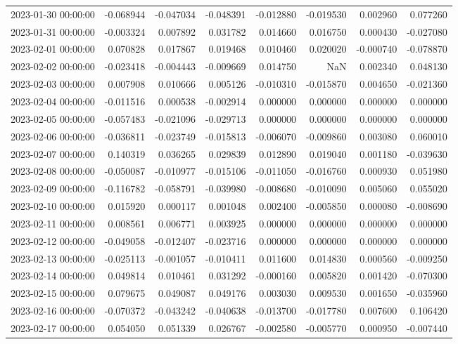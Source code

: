 \begin{tabular}{lrrrrrrr}
2023-01-30 00:00:00 & -0.068944 & -0.047034 & -0.048391 & -0.012880 & -0.019530 & 0.002960 & 0.077260 \\
2023-01-31 00:00:00 & -0.003324 & 0.007892 & 0.031782 & 0.014660 & 0.016750 & 0.000430 & -0.027080 \\
2023-02-01 00:00:00 & 0.070828 & 0.017867 & 0.019468 & 0.010460 & 0.020020 & -0.000740 & -0.078870 \\
2023-02-02 00:00:00 & -0.023418 & -0.004443 & -0.009669 & 0.014750 & NaN & 0.002340 & 0.048130 \\
2023-02-03 00:00:00 & 0.007908 & 0.010666 & 0.005126 & -0.010310 & -0.015870 & 0.004650 & -0.021360 \\
2023-02-04 00:00:00 & -0.011516 & 0.000538 & -0.002914 & 0.000000 & 0.000000 & 0.000000 & 0.000000 \\
2023-02-05 00:00:00 & -0.057483 & -0.021096 & -0.029713 & 0.000000 & 0.000000 & 0.000000 & 0.000000 \\
2023-02-06 00:00:00 & -0.036811 & -0.023749 & -0.015813 & -0.006070 & -0.009860 & 0.003080 & 0.060010 \\
2023-02-07 00:00:00 & 0.140319 & 0.036265 & 0.029839 & 0.012890 & 0.019040 & 0.001180 & -0.039630 \\
2023-02-08 00:00:00 & -0.050087 & -0.010977 & -0.015106 & -0.011050 & -0.016760 & 0.000930 & 0.051980 \\
2023-02-09 00:00:00 & -0.116782 & -0.058791 & -0.039980 & -0.008680 & -0.010090 & 0.005060 & 0.055020 \\
2023-02-10 00:00:00 & 0.015920 & 0.000117 & 0.001048 & 0.002400 & -0.005850 & 0.000080 & -0.008690 \\
2023-02-11 00:00:00 & 0.008561 & 0.006771 & 0.003925 & 0.000000 & 0.000000 & 0.000000 & 0.000000 \\
2023-02-12 00:00:00 & -0.049058 & -0.012407 & -0.023716 & 0.000000 & 0.000000 & 0.000000 & 0.000000 \\
2023-02-13 00:00:00 & -0.025113 & -0.001057 & -0.010411 & 0.011600 & 0.014830 & 0.000560 & -0.009250 \\
2023-02-14 00:00:00 & 0.049814 & 0.010461 & 0.031292 & -0.000160 & 0.005820 & 0.001420 & -0.070300 \\
2023-02-15 00:00:00 & 0.079675 & 0.049087 & 0.049176 & 0.003030 & 0.009530 & 0.001650 & -0.035960 \\
2023-02-16 00:00:00 & -0.070372 & -0.043242 & -0.040638 & -0.013700 & -0.017780 & 0.007600 & 0.106420 \\
2023-02-17 00:00:00 & 0.054050 & 0.051339 & 0.026767 & -0.002580 & -0.005770 & 0.000950 & -0.007440 \\

\end{tabular}
